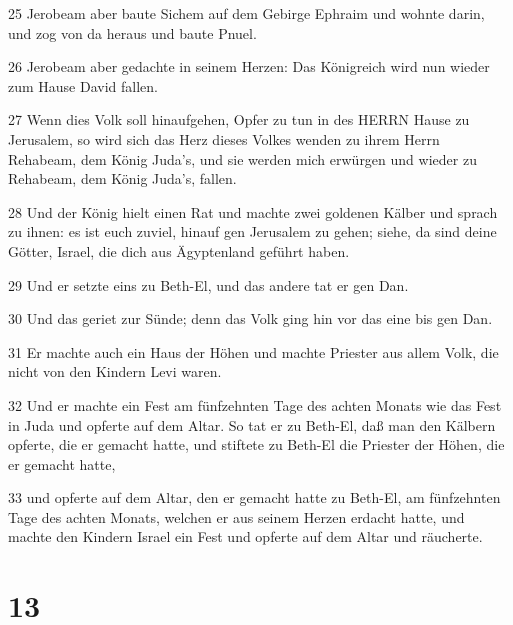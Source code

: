 \par 25 Jerobeam aber baute Sichem auf dem Gebirge Ephraim und wohnte darin, und zog von da heraus und baute Pnuel.
\par 26 Jerobeam aber gedachte in seinem Herzen: Das Königreich wird nun wieder zum Hause David fallen.
\par 27 Wenn dies Volk soll hinaufgehen, Opfer zu tun in des HERRN Hause zu Jerusalem, so wird sich das Herz dieses Volkes wenden zu ihrem Herrn Rehabeam, dem König Juda's, und sie werden mich erwürgen und wieder zu Rehabeam, dem König Juda's, fallen.
\par 28 Und der König hielt einen Rat und machte zwei goldenen Kälber und sprach zu ihnen: es ist euch zuviel, hinauf gen Jerusalem zu gehen; siehe, da sind deine Götter, Israel, die dich aus Ägyptenland geführt haben.
\par 29 Und er setzte eins zu Beth-El, und das andere tat er gen Dan.
\par 30 Und das geriet zur Sünde; denn das Volk ging hin vor das eine bis gen Dan.
\par 31 Er machte auch ein Haus der Höhen und machte Priester aus allem Volk, die nicht von den Kindern Levi waren.
\par 32 Und er machte ein Fest am fünfzehnten Tage des achten Monats wie das Fest in Juda und opferte auf dem Altar. So tat er zu Beth-El, daß man den Kälbern opferte, die er gemacht hatte, und stiftete zu Beth-El die Priester der Höhen, die er gemacht hatte,
\par 33 und opferte auf dem Altar, den er gemacht hatte zu Beth-El, am fünfzehnten Tage des achten Monats, welchen er aus seinem Herzen erdacht hatte, und machte den Kindern Israel ein Fest und opferte auf dem Altar und räucherte.

\chapter{13}

